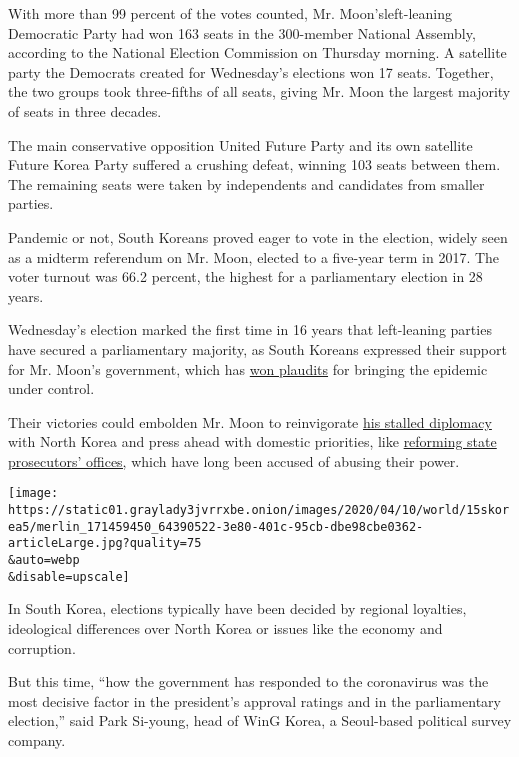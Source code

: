With more than 99 percent of the votes counted, Mr. Moon's ​left-leaning
​Democratic Party had won 163 seats in the 300-member National Assembly,
according to the National Election Commission on Thursday morning. A
satellite party the Democrats created for Wednesday's elections won 17
seats. Together, the two groups took three-fifths of all seats, giving
Mr. Moon the largest majority of seats in three decades.

The main conservative opposition United Future Party and its own
satellite Future Korea Party suffered a crushing defeat, winning ​103
seats​ between them​. ​The remaining seats were taken by independents
and candidates from smaller parties.

Pandemic or not, South Koreans proved eager to vote in the election,
widely seen as a midterm referendum on Mr. Moon​, elected to a five-year
term in 2017.​ The voter turnout was 66.2 percent, the highest for a
parliamentary election in 28 years.

Wednesday's election marked the first time in 16 years that left-leaning
parties ​have secured a parliamentary majority, as South Koreans
expressed their support for Mr. Moon's government, which has
\href{https://www.nytimes3xbfgragh.onion/2020/03/23/world/asia/coronavirus-south-korea-flatten-curve.html}{won
plaudits} for bringing the epidemic under control​. ​

Their victories could embolden Mr. Moon to reinvigorate
\href{https://www.nytimes3xbfgragh.onion/2019/02/28/world/asia/moon-jae-in-kim-jong.html}{his
stalled diplomacy} with North Korea and ​press ahead with domestic
priorities, like
\href{https://www.nytimes3xbfgragh.onion/2019/10/12/world/asia/south-korea-protests.html}{reform​ing
state prosecutors' offices,​​} ​which have ​​long ​been ​accused of
abusing their power.

\texttt{[image: https://static01.graylady3jvrrxbe.onion/images/2020/04/10/world/15skorea5/merlin\_171459450\_64390522-3e80-401c-95cb-dbe98cbe0362-articleLarge.jpg?quality=75\\\&auto=webp\\\&disable=upscale]}

In South Korea, elections typically have been decided by regional
loyalties​, ideological differences over North Korea or issues like the
economy and corruption.

But this time, ``how the government has responded to the coronavirus was
the most decisive factor in the president's approval ratings and in the
parliamentary ​election,'' said Park Si-young, head of WinG Korea, a
Seoul-based political survey company.

